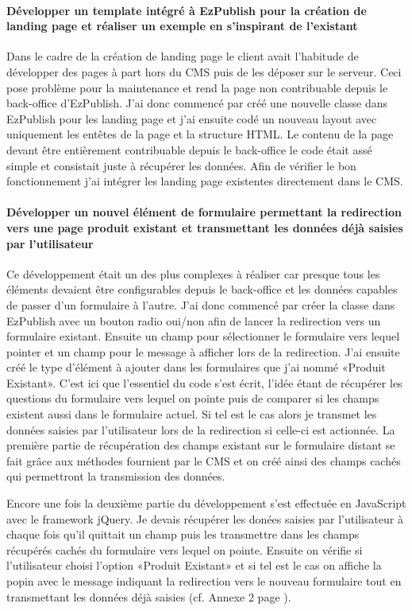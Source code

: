 \documentclass[a4paper,11pt,twoside]{report}
\begin{document}
      \paragraph*{Développer un template intégré à EzPublish pour la création de landing page et réaliser un exemple en s'inspirant de l'existant}
      Dans le cadre de la création de landing page le client avait l'habitude de développer des pages à part hors du CMS puis de les déposer sur le serveur. Ceci pose problème pour la maintenance et rend la page non contribuable depuis le back-office d'EzPublish. J'ai donc commencé par créé une nouvelle classe dans EzPublish pour les landing page et j'ai ensuite codé un nouveau layout avec uniquement les entêtes de la page et la structure HTML. Le contenu de la page devant être entièrement contribuable depuis le back-office le code était assé simple et consistait juste à récupérer les données. Afin de vérifier le bon fonctionnement j'ai intégrer les landing page existentes directement dans le CMS.
      \paragraph*{Développer un nouvel élément de formulaire permettant la redirection vers une page produit existant et transmettant les données déjà saisies par l'utilisateur}
      Ce développement était un des plus complexes à réaliser car presque tous les éléments devaient être configurables depuis le back-office et les données capables de passer d'un formulaire à l'autre. J'ai donc commencé par créer la classe dans EzPublish avec un bouton radio oui/non afin de lancer la redirection vers un formulaire existant. Ensuite un champ pour sélectionner le formulaire vers lequel pointer et un champ pour le message à afficher lors de la redirection. 
      J'ai ensuite créé le type d'élément à ajouter dans les formulaires que j'ai nommé «Produit Existant». C'est ici que l'essentiel du code s'est écrit, l'idée étant de récupérer les questions du formulaire vers lequel on pointe puis de comparer si les champs existent aussi dans le formulaire actuel. Si tel est le cas alors je transmet les données saisies par l'utilisateur lors de la redirection si celle-ci est actionnée. 
      La première partie de récupération des champs existant sur le formulaire distant se fait grâce aux méthodes fournient par le CMS et on créé ainsi des champs cachés qui permettront la transmission des données. 
      
      Encore une fois la deuxième partie du développement s'est effectuée en JavaScript avec le framework jQuery. Je devais récupérer les donées saisies par l'utilisateur à chaque fois qu'il quittait un champ puis les transmettre dans les champs récupérés cachés du formulaire vers lequel on pointe. Ensuite on vérifie si l'utilisateur choisi l'option «Produit Existant» et si tel est le cas on affiche la popin avec le message indiquant la redirection vers le nouveau formulaire tout en transmettant les données déjà saisies (cf. Annexe 2 page \pageref{annexe2}).
\end{document}
